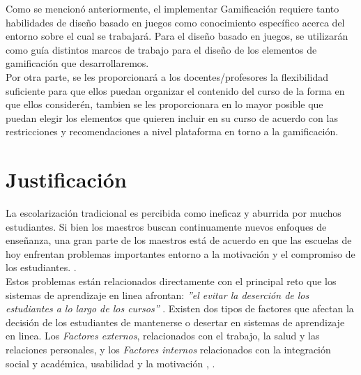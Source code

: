 \noindent Como se mencionó anteriormente, el implementar Gamificación requiere tanto habilidades de diseño basado en juegos como conocimiento específico acerca del entorno sobre el cual se trabajará. Para el diseño basado en juegos, se utilizarán como guía distintos marcos de trabajo para el diseño de los elementos de gamificación que desarrollaremos.\\

\noindent Por otra parte, se les proporcionará a los docentes/profesores la flexibilidad suficiente para que ellos puedan organizar el contenido del curso de la forma en que ellos considerén, tambien se les proporcionara en lo mayor posible que puedan elegir los elementos que quieren incluir en su curso de acuerdo con las restricciones y recomendaciones a nivel plataforma en torno a la gamificación.
    
\clearpage


\section{Justificación}
\label{sec:justificacion}


La escolarización tradicional es percibida como ineficaz y aburrida por muchos estudiantes. Si bien los maestros buscan continuamente nuevos enfoques de enseñanza, una gran parte de los maestros está de acuerdo en que las escuelas de hoy enfrentan problemas importantes entorno a la motivación y el compromiso de los estudiantes. \cite{objetivo1}.\\

\noindent Estos problemas están relacionados directamente con el principal reto que los sistemas de aprendizaje en linea afrontan: {\it''el evitar la deserción de los estudiantes a lo largo de los cursos''} \cite{objetivo1}. Existen dos tipos de factores que afectan la decisión de los estudiantes de mantenerse o desertar en sistemas de aprendizaje en linea. Los {\it Factores externos}, relacionados con el trabajo, la salud y las relaciones personales, y los {\it Factores internos} relacionados con la integración social y académica, usabilidad y la motivación \cite{DropOut}, \cite{dropoutOnline}.\\
    
